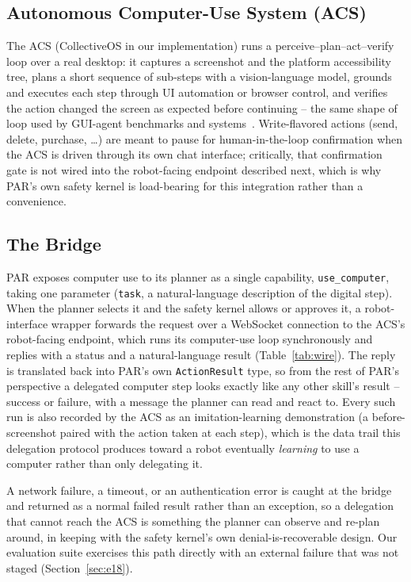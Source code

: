 \documentclass{article}
\begin{document}
\subsection{Autonomous Computer-Use System (ACS)}
\label{sec:acs}
The ACS (CollectiveOS in our implementation) runs a perceive--plan--act--verify loop over a real desktop: it captures a screenshot and the platform accessibility tree, plans a short sequence of sub-steps with a vision-language model, grounds and executes each step through UI automation or browser control, and verifies the action changed the screen as expected before continuing -- the same shape of loop used by GUI-agent benchmarks and systems~\citep{zhou2024webarena, deng2023mind2web, hong2024cogagent, anthropic2024computeruse}. Write-flavored actions (send, delete, purchase, \ldots) are meant to pause for human-in-the-loop confirmation when the ACS is driven through its own chat interface; critically, that confirmation gate is not wired into the robot-facing endpoint described next, which is why PAR's own safety kernel is load-bearing for this integration rather than a convenience.

\subsection{The Bridge}
PAR exposes computer use to its planner as a single capability, \texttt{use\_computer}, taking one parameter (\texttt{task}, a natural-language description of the digital step). When the planner selects it and the safety kernel allows or approves it, a robot-interface wrapper forwards the request over a WebSocket connection to the ACS's robot-facing endpoint, which runs its computer-use loop synchronously and replies with a status and a natural-language result (Table~\ref{tab:wire}). The reply is translated back into PAR's own \texttt{ActionResult} type, so from the rest of PAR's perspective a delegated computer step looks exactly like any other skill's result -- success or failure, with a message the planner can read and react to. Every such run is also recorded by the ACS as an imitation-learning demonstration (a before-screenshot paired with the action taken at each step), which is the data trail this delegation protocol produces toward a robot eventually \emph{learning} to use a computer rather than only delegating it.

A network failure, a timeout, or an authentication error is caught at the bridge and returned as a normal failed result rather than an exception, so a delegation that cannot reach the ACS is something the planner can observe and re-plan around, in keeping with the safety kernel's own denial-is-recoverable design. Our evaluation suite exercises this path directly with an external failure that was not staged (Section~\ref{sec:e18}).
\end{document}
